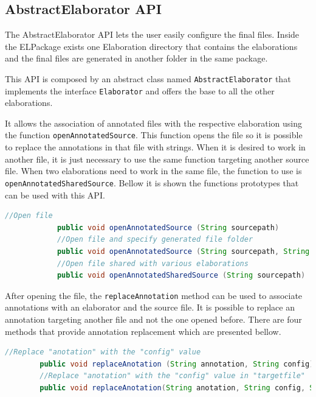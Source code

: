 \documentclass[11pt]{report}
\begin{document}
		\subsection{AbstractElaborator API}
		
		\par The AbstractElaborator API lets the user easily configure the final files. Inside the ELPackage exists one Elaboration directory that contains the elaborations and the final files are generated in another folder in the same package.
		\par This API is composed by an abstract class named \texttt{AbstractElaborator} that implements the interface \texttt{Elaborator} and offers the base to all the other elaborations.
		\par It allows the association of annotated files with the respective elaboration using the function \texttt{openAnnotatedSource}. This function opens the file so it is possible to replace the annotations in that file with strings. When it is desired to work in another file, it is just necessary to use the same function targeting another source file. When two elaborations need to work in the same file, the function to use is \texttt{openAnnotatedSharedSource}. Bellow it is shown the functions prototypes that can be used with this API.
		
		\begin{lstlisting}[language=Java]
			//Open file
			public void openAnnotatedSource (String sourcepath)
			//Open file and specify generated file folder
			public void openAnnotatedSource (String sourcepath, String targetPath)
			//Open file shared with various elaborations
			public void openAnnotatedSharedSource (String sourcepath)
		\end{lstlisting}
		
		\par After opening the file, the \texttt{replaceAnnotation} method can be used to associate annotations with an elaborator and the source file. It is possible to replace an annotation targeting another file and not the one opened before. There are four methods that provide annotation replacement which are presented bellow.
		
		\begin{lstlisting}[language=Java]
		//Replace "anotation" with the "config" value		
		public void replaceAnotation (String annotation, String config)
		//Replace "anotation" with the "config" value in "targetfile"
		public void replaceAnotation(String anotation, String config, String targetfile)
		\end{lstlisting}
		
\end{document}
